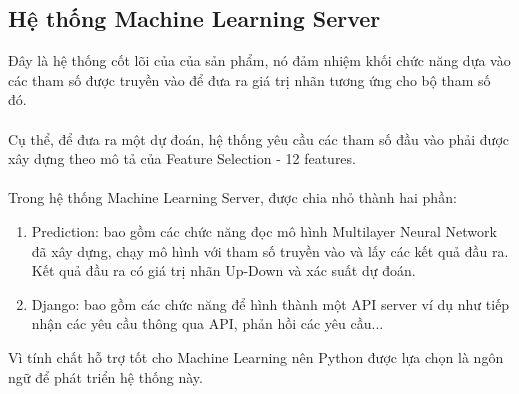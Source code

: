 \subsection{Hệ thống Machine Learning Server}
Đây là hệ thống cốt lõi của của sản phẩm, nó đảm nhiệm khối chức năng dựa vào 
các tham số được truyền vào để đưa ra giá trị nhãn tương ứng cho bộ tham số 
đó.\\\\
Cụ thể, để đưa ra một dự đoán, hệ thống yêu cầu các tham số đầu vào phải được 
xây dựng theo mô tả của Feature Selection - 12 features.\\\\
Trong hệ thống Machine Learning Server, được chia nhỏ thành hai phần:\\
\begin{enumerate}
\item Prediction: bao gồm các chức năng đọc mô hình Multilayer Neural Network 
đã xây dựng, chạy mô hình với tham số truyền vào và lấy các kết quả đầu ra.
Kết quả đầu ra có giá trị nhãn Up-Down và xác suất dự đoán.
\item Django: bao gồm các chức năng để hình thành một API server ví dụ như 
tiếp nhận các yêu cầu thông qua API, phản hồi các yêu cầu...
\end{enumerate}
Vì tính chất hỗ trợ tốt cho Machine Learning nên Python được lựa chọn là ngôn 
ngữ để phát triển hệ thống này.\\\\
